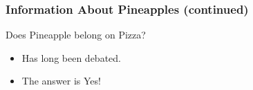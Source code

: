 \documentclass{beamer}
\begin{document}
\begin{frame}
    \frametitle{Information About Pineapples (continued)}

    \begin{alertblock}{Does Pineapple belong on Pizza?}
        \begin{itemize}
            \item Has long been debated. \pause
            \item The answer is \alert{Yes}!
        \end{itemize}

    \end{alertblock}

\end{frame}
\end{document}
